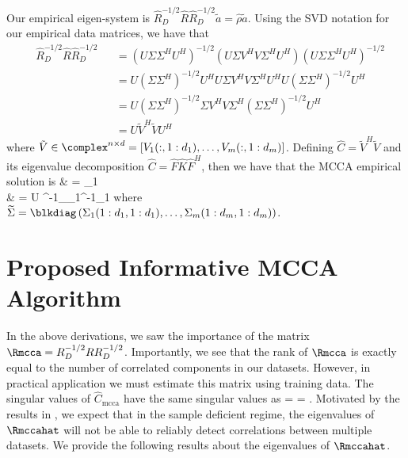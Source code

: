 Our empirical eigen-system is
$\widehat{R}_D^{-1/2}\widehat{R}\widehat{R}_D^{-1/2}\widetilde{a} =
\widehat{\rho}\widetilde{a}$. Using the SVD notation for our empirical data matrices, we
have that
\begin{equation*}
\begin{aligned}
&\widehat{R}_D^{-1/2}\widehat{R}\widehat{R}_D^{-1/2}&&=\left(U\Sigma\Sigma^HU^H\right)^{-1/2}\left(U\Sigma V^HV\Sigma^H U^H\right)\left(U\Sigma\Sigma^HU^H\right)^{-1/2}\\
&&&=U(\Sigma\Sigma^H)^{-1/2}U^HU\Sigma V^HV\Sigma^HU^HU(\Sigma\Sigma^H)^{-1/2}U^H\\
&&& = U(\Sigma\Sigma^H)^{-1/2}\Sigma V^HV\Sigma^H(\Sigma\Sigma^H)^{-1/2}U^H\\
&&&=U\widetilde{V}^H\widetilde{V}U^H
\end{aligned}
\end{equation*}
where $\tilde{V}\in\complex^{n\times d}=[V_1(:,1:d_1),\dots,V_m(:,1:d_m)]$. Defining $\widehat{C} = \widetilde{V}^H\widetilde{V}$ and its eigenvalue decomposition $\widehat{C} = \widehat{F}\widehat{K}\widehat{F}^H$, then we have that the MCCA empirical solution is
\be\ba
& \widehat{\rho} = _1\\
&  = U \widetilde{\Sigma}^{-1}\Lambda_{_1}^{-1}_1
\ea\ee
where $\widetilde{\Sigma} = \blkdiag\left(\Sigma_1(1:d_1,1:d_1),\dots, \Sigma_m(1:d_m,1:d_m)\right)$.

\section{Proposed Informative MCCA Algorithm}

In the above derivations, we saw the importance of the matrix
$\Rmcca=R_D^{-1/2}RR_D^{-1/2}$. Importantly, we see that the rank of $\Rmcca$ is exactly
equal to the number of correlated components in our datasets. However, in practical
application we must estimate this matrix using training data. The singular values of
$\widehat{C}_{\text{mcca}}$ have the same singular values as
\beq\label{eq:chpt10:R_mcca}
\Rmccahat =
 = .
\eeq
Motivated by the results in \cite{pezeshki2004empirical}, we expect that in the sample
deficient regime, the eigenvalues of $\Rmccahat$ will not be able to reliably detect
correlations between multiple datasets. We provide the following results about the
eigenvalues of $\Rmccahat$.

